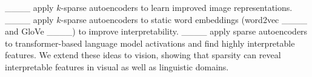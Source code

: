 ____ apply $k$-sparse autoencoders to learn improved image representations.
____ apply $k$-sparse autoencoders to static word embeddings (word2vec ____ and GloVe ____) to improve interpretability.
____ apply sparse autoencoders to transformer-based language model activations and find highly interpretable features.
We extend these ideas to vision, showing that sparsity can reveal interpretable features in visual as well as linguistic domains.

